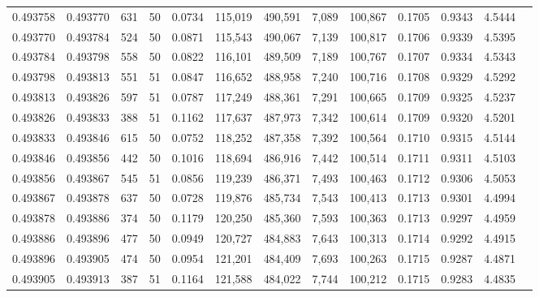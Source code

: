 \begin{tabular}{rrrrrrrrrrrrr}
0.493758 & 0.493770 &   631 &  50 &                                     0.0734 & 115,019 & 490,591 &   7,089 & 100,867 & 0.1705 & 0.9343 & 4.5444 \\
0.493770 & 0.493784 &   524 &  50 &                                     0.0871 & 115,543 & 490,067 &   7,139 & 100,817 & 0.1706 & 0.9339 & 4.5395 \\
0.493784 & 0.493798 &   558 &  50 &                                     0.0822 & 116,101 & 489,509 &   7,189 & 100,767 & 0.1707 & 0.9334 & 4.5343 \\
0.493798 & 0.493813 &   551 &  51 &                                     0.0847 & 116,652 & 488,958 &   7,240 & 100,716 & 0.1708 & 0.9329 & 4.5292 \\
0.493813 & 0.493826 &   597 &  51 &                                     0.0787 & 117,249 & 488,361 &   7,291 & 100,665 & 0.1709 & 0.9325 & 4.5237 \\
0.493826 & 0.493833 &   388 &  51 &                                     0.1162 & 117,637 & 487,973 &   7,342 & 100,614 & 0.1709 & 0.9320 & 4.5201 \\
0.493833 & 0.493846 &   615 &  50 &                                     0.0752 & 118,252 & 487,358 &   7,392 & 100,564 & 0.1710 & 0.9315 & 4.5144 \\
0.493846 & 0.493856 &   442 &  50 &                                     0.1016 & 118,694 & 486,916 &   7,442 & 100,514 & 0.1711 & 0.9311 & 4.5103 \\
0.493856 & 0.493867 &   545 &  51 &                                     0.0856 & 119,239 & 486,371 &   7,493 & 100,463 & 0.1712 & 0.9306 & 4.5053 \\
0.493867 & 0.493878 &   637 &  50 &                                     0.0728 & 119,876 & 485,734 &   7,543 & 100,413 & 0.1713 & 0.9301 & 4.4994 \\
0.493878 & 0.493886 &   374 &  50 &                                     0.1179 & 120,250 & 485,360 &   7,593 & 100,363 & 0.1713 & 0.9297 & 4.4959 \\
0.493886 & 0.493896 &   477 &  50 &                                     0.0949 & 120,727 & 484,883 &   7,643 & 100,313 & 0.1714 & 0.9292 & 4.4915 \\
0.493896 & 0.493905 &   474 &  50 &                                     0.0954 & 121,201 & 484,409 &   7,693 & 100,263 & 0.1715 & 0.9287 & 4.4871 \\
0.493905 & 0.493913 &   387 &  51 &                                     0.1164 & 121,588 & 484,022 &   7,744 & 100,212 & 0.1715 & 0.9283 & 4.4835 \\

\end{tabular}
